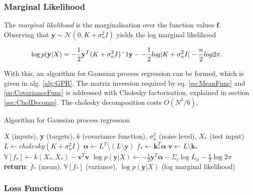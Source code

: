 \documentclass[12pt,a4paper]{report}
\theoremstyle{definition}
\begin{document}
\subsubsection{Marginal Likelihood}

The \emph{marginal likelihood} is the marginalisation over the function values $\textbf{f}$. 
Observing that $\textbf{y} \sim \mathcal{N} (0, K + \sigma_{n}^2I)$ yields the log marginal likelihood

\begin{equation}
	\label{eq:LogMargLik}
	\centering
	\log p(\textbf{y} | X) = -\frac{1}{2}\textbf{y}^T(K +  \sigma_{n}^2I)^-1\textbf{y} - -\frac{1}{2}log|K +  \sigma_{n}^2I| - \frac{n}{2}log2\pi.
\end{equation}

With this, an algorithm for Gaussian process regression can be formed, which is given in alg. \ref{alg:GPR}. The matrix inversion required by eq. \ref{eq:MeanFunc} and \ref{eq:CovarianceFunc} is addressed with Cholesky factorisation, explained in section \ref{sec:CholDecomp}. The cholesky decomposition costs $O(N^3/6)$.

\begin{algorithm}
	\caption{Algorithm for Gaussian process regression \citep{RasmussenWilliams2006}}
	\label{alg:GPR}
	\begin{algorithmic}[1]
		\Require $X$ (inputs), \textbf{y} (targets), $k$ (covariance function), $\sigma_{n}^2$ (noise level), $X_{*}$ (test input)	
		\State $L \gets cholesky(K +\sigma_{n}^2I)$
		\State $\boldsymbol{\alpha} \gets L^T \setminus (L \setminus \textbf{y})$ 
		\State $\overline{f}_{*} \gets \textbf{k}_{*}^T \boldsymbol{\alpha}$ 
		\State $\textbf{v} \gets L \setminus \textbf{k}_{*}$ 
		\State $\mathbb{V}[f_{*}] \gets k(X_{*}, X_{*}) - \textbf{v}^T\textbf{v}$ 
		\State $\log p(\textbf{y} | X) \gets -\frac{1}{2} \textbf{y}^T \boldsymbol{\alpha} - \Sigma_{i} \log L_{ii} - \frac{n}{2} \log2\pi$ 
		\State \textbf{return}: $\overline{f}_{*}$ (mean), $\mathbb{V}[f_{*}]$ (variance), $\log p(\textbf{y} | X)$ (log marginal likelihood)
	\end{algorithmic}
\end{algorithm}

\subsubsection{Loss Functions}
\end{document}
